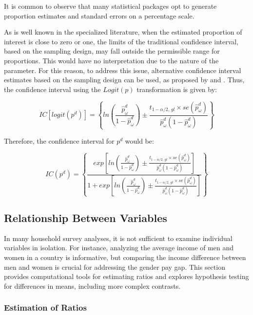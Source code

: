 \documentclass[
  12pt,
]{book}
\begin{document}
It is common to observe that many statistical packages opt to generate proportion estimates and standard errors on a percentage scale.

As is well known in the specialized literature, when the estimated proportion of interest is close to zero or one, the limits of the traditional confidence interval, based on the sampling design, may fall outside the permissible range for proportions. This would have no interpretation due to the nature of the parameter. For this reason, to address this issue, alternative confidence interval estimates based on the sampling design can be used, as proposed by \citet{Rust2007ConfidenceIF} and \citet{DeanPagano2015}. Thus, the confidence interval using the \(Logit\left(p\right)\) transformation is given by:

\[
IC\left[logit\left(p^d\right)\right]  =  \left\{ ln\left(\frac{\hat{p}_{\omega}^d}{1-\hat{p}_{\omega}^d}\right)\pm\frac{t_{1-\alpha/2,\,gl} \times   se\left(\hat{p}_{\omega}^d\right)}{\hat{p}_{\omega}^d\left(1-\hat{p}_{\omega}^d\right)}\right\} 
\]

Therefore, the confidence interval for \(p^d\) would be:

\[
IC\left(p^d\right)  =  \left\{ \frac{exp\left[ln\left(\frac{\hat{p}_{\omega}^d}{1-\hat{p}_{\omega}^d}\right)\pm\frac{t_{1-\alpha/2,\,gl}\times se\left(\hat{p}_{\omega}^d\right)}{\hat{p}_{\omega}^d\left(1-\hat{p}_{\omega}^d\right)}\right]}{1+exp\left[ln\left(\frac{\hat{p}_{\omega}^d}{1-\hat{p}_{\omega}^d}\right)\pm\frac{t_{1-\alpha/2,\,gl}\times se\left(\hat{p}_{\omega}^d\right)}{\hat{p}_{\omega}^d\left(1-\hat{p}_{\omega}^d\right)}\right]}\right\} 
\]

\subsection{Relationship Between Variables}\label{relationship-between-variables}

In many household survey analyses, it is not sufficient to examine individual variables in isolation. For instance, analyzing the average income of men and women in a country is informative, but comparing the income difference between men and women is crucial for addressing the gender pay gap. This section provides computational tools for estimating ratios and explores hypothesis testing for differences in means, including more complex contrasts.

\subsubsection{Estimation of Ratios}\label{estimation-of-ratios}
\end{document}
